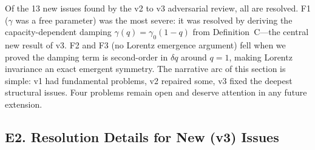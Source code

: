 \documentclass[reprint]{revtex4-2}
\begin{document}
Of the 13 new issues found by the v2 to v3 adversarial review, all are resolved. F1 ($\gamma$ was a free parameter) was the most severe: it was resolved by deriving the capacity-dependent damping $\gamma(q)=\gamma_0(1-q)$ from Definition~C---the central new result of v3. F2 and F3 (no Lorentz emergence argument) fell when we proved the damping term is second-order in $\delta q$ around $q=1$, making Lorentz invariance an exact emergent symmetry. The narrative arc of this section is simple: v1 had fundamental problems, v2 repaired some, v3 fixed the deepest structural issues. Four problems remain open and deserve attention in any future extension.

\subsection{E2. Resolution Details for New (v3) Issues}
\end{document}
